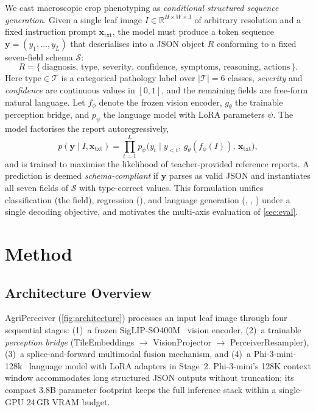 \documentclass[runningheads]{llncs}
\newcommand{\ours}{AgriPerceiver}
\begin{document}
We cast macroscopic crop phenotyping as \emph{conditional structured sequence generation}. Given a single leaf image $I \in \mathbb{R}^{H \times W \times 3}$ of arbitrary resolution and a fixed instruction prompt $\mathbf{x}_{\text{txt}}$, the model must produce a token sequence $\mathbf{y} = (y_1,\ldots,y_L)$ that deserialises into a JSON object $R$ conforming to a fixed seven-field schema $\mathcal{S}$:
\begin{equation}
  R = \{\,\text{diagnosis},\, \text{type},\, \text{severity},\, \text{confidence},\, \text{symptoms},\, \text{reasoning},\, \text{actions}\,\}.
  \label{eq:schema}
\end{equation}
Here $\text{type}\in\mathcal{T}$ is a categorical pathology label over $|\mathcal{T}|{=}6$ classes, \emph{severity} and \emph{confidence} are continuous values in $[0,1]$, and the remaining fields are free-form natural language. Let $f_\phi$ denote the frozen vision encoder, $g_\theta$ the trainable perception bridge, and $p_\psi$ the language model with LoRA parameters $\psi$. The model factorises the report autoregressively,
\begin{equation}
  p(\mathbf{y}\mid I, \mathbf{x}_{\text{txt}})
  = \prod_{t=1}^{L} p_\psi\!\bigl(y_t \mid y_{<t},\, g_\theta(f_\phi(I)),\, \mathbf{x}_{\text{txt}}\bigr),
  \label{eq:factorization}
\end{equation}
and is trained to maximise the likelihood of teacher-provided reference reports. A prediction is deemed \emph{schema-compliant} if $\mathbf{y}$ parses as valid JSON and instantiates all seven fields of $\mathcal{S}$ with type-correct values. This formulation unifies classification (the  field), regression (), and language generation (, , ) under a single decoding objective, and motivates the multi-axis evaluation of \cref{sec:eval}.

\section{Method}
\label{sec:method}

\subsection{Architecture Overview}

\ours{} (\cref{fig:architecture}) processes an input leaf image through
four sequential stages:
(1)~a frozen SigLIP-SO400M~\cite{zhai2023sigmoid} vision encoder,
(2)~a trainable \emph{perception bridge} (TileEmbeddings $\to$
VisionProjector $\to$ PerceiverResampler),
(3)~a splice-and-forward multimodal fusion mechanism, and
(4)~a Phi-3-mini-128k~\cite{abdin2024phi3} language model with LoRA
adapters in Stage~2. Phi-3-mini's 128K context window accommodates long structured JSON
outputs without truncation; its compact 3.8B parameter footprint keeps
the full inference stack within a single-GPU 24\,GB VRAM budget.
\end{document}
